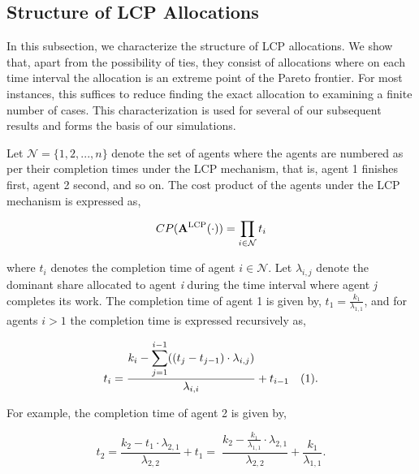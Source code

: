 \documentclass[letterpaper]{article} %
\theoremstyle{definition}
\begin{document}
\subsection{Structure of LCP Allocations}

In this subsection, we characterize the structure of LCP allocations. We show that, apart from the possibility of ties, they consist of allocations where on each time interval the allocation is an extreme point of the Pareto frontier.  For most instances, this suffices to reduce finding the exact allocation to examining a finite number of cases.  This characterization is used for several of our subsequent results and forms the basis of our simulations.

Let $\mathcal{N} = \{1,2,...,n\}$ denote the set of agents where the agents are numbered as per their completion times under the LCP mechanism, that is, agent 1 finishes first, agent 2 second, and so on. The cost product of the agents under the LCP mechanism is expressed as,

\begin{linenomath}
\begin{equation*}
    CP(\mathbf{A}^{\textnormal{LCP}}(\cdot)) = \displaystyle \prod_{i \in \mathcal{N}} t_{i}
\end{equation*}
\end{linenomath}

\noindent where $t_{i}$ denotes the completion time of agent $i \in \mathcal{N}$. Let $\lambda_{i,j}$ denote the dominant share allocated to agent \textit{i} during the time interval where agent \textit{j} completes its work. The completion time of agent 1 is given by,
$t_{1} = \displaystyle \frac{k_{1}}{\lambda_{1,1}}$, and for agents $i > 1$ the completion time is expressed recursively as,
\begin{linenomath}
\begin{equation*}
    t_{i} = \displaystyle \frac{k_{i} - \displaystyle \sum^{i -1}_{j = 1} ((t_{j} - t_{j-1}) \cdot \lambda_{i,j})}{\lambda_{i,i}} + t_{i-1} \quad \textnormal{(1)}.
\end{equation*}
\end{linenomath}

\noindent For example, the completion time of agent 2 is given by,
\begin{linenomath}
\begin{equation*}
    t_{2} = \displaystyle \frac{k_{2} - t_{1} \cdot \lambda_{2,1}}{\lambda_{2,2}} + t_{1} = \; \frac{k_{2} - \displaystyle \frac{k_{1}}{\lambda_{1,1}} \cdot \lambda_{2,1}}{\lambda_{2,2}} + \frac{k_{1}}{\lambda_{1,1}}.
\end{equation*}
\end{linenomath}
\end{document}
